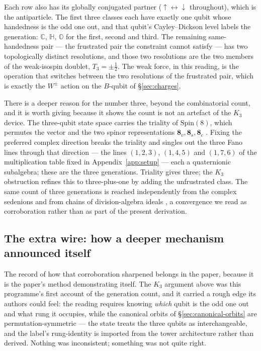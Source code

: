 Each row also has its globally conjugated partner ($\uparrow\!\leftrightarrow\!\downarrow$
throughout), which is the antiparticle. The first three classes each have exactly one qubit whose
handedness is the odd one out, and that qubit's Cayley--Dickson level labels the generation:
$\mathbb{C}$, $\mathbb{H}$, $\mathbb{O}$ for the first, second and third. The remaining
same-handedness pair --- the frustrated pair the constraint cannot satisfy --- has two topologically
distinct resolutions, and those two resolutions are the two members of the weak-isospin doublet,
$T_3 = \pm\tfrac12$. The weak force, in this reading, is the operation that switches between the two
resolutions of the frustrated pair, which is exactly the $W^\pm$ action on the $B$-qubit of
\S\ref{sec:charges}.

There is a deeper reason for the number three, beyond the combinatorial count, and it is worth
giving because it shows the count is not an artefact of the $K_3$ device. The three-qubit state
space carries the triality of $\mathrm{Spin}(8)$, which permutes the vector and the two spinor
representations $\mathbf{8}_v, \mathbf{8}_s, \mathbf{8}_c$ \autocite{baez2002octonions}. Fixing the
preferred complex direction breaks the triality and singles out the three Fano lines through that
direction --- the lines $(1,2,3)$, $(1,4,5)$ and $(1,7,6)$ of the multiplication table fixed in
Appendix~\ref{app:setup} --- each a quaternionic subalgebra; these are the three generations.
Triality gives three; the $K_3$ obstruction refines this to three-plus-one by adding the
unfrustrated class. The same count of three generations is reached independently from the complex
sedenions and from chains of division-algebra ideals \autocite{gillardgresnigt2019three,furey2018three},
a convergence we read as corroboration rather than as part of the present derivation.

\subsection{The extra wire: how a deeper mechanism announced itself}
\label{sec:sedenion-announcement}

The record of how that corroboration sharpened belongs in the paper, because it is the paper's
method demonstrating itself. The $K_3$ argument above was this programme's first account of the
generation count, and it carried a rough edge its authors could feel: the reading requires knowing
\emph{which} qubit is the odd one out and what rung it occupies, while the canonical orbits of
\S\ref{sec:canonical-orbits} are permutation-symmetric --- the state treats the three qubits as
interchangeable, and the label's rung-identity is imported from the tower architecture rather than
derived. Nothing was inconsistent; something was not quite right.

